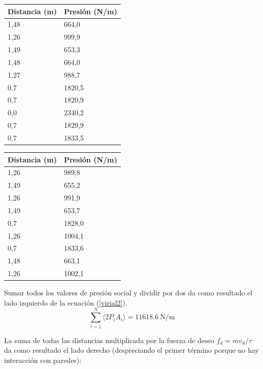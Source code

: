 \begin{center}
\label{my-label}
\begin{tabular}{|l|l|}
\hline
Distancia (m) & Presión (N/m) \\ \hline
1,48          & 664,0       \\ \hline
1,26          & 999,9       \\ \hline
1,49          & 653,3       \\ \hline
1,48          & 664,0       \\ \hline
1,27          & 988,7       \\ \hline
0,7           & 1820,5       \\ \hline
0,7           & 1820,9       \\ \hline
0,0           & 2340,2       \\ \hline
0,7           & 1829,9       \\ \hline
0,7           & 1833,5       \\ \hline
\end{tabular}
\quad
\begin{tabular}{|l|l|}
\hline
Distancia (m) & Presión (N/m) \\ \hline
1,26          & 989,8       \\ \hline
1,49          & 655,2       \\ \hline
1,26          & 991,9       \\ \hline
1,49          & 653,7        \\ \hline
0,7           & 1828,0       \\ \hline
1,26          & 1004,1       \\ \hline
0,7           & 1833,6       \\ \hline
1,48          & 663,1       \\ \hline
1,26          & 1002,1       \\ \hline
\end{tabular}
\end{center}


Sumar todos los valores de presión social y dividir por dos da como resultado el lado izquierdo de la ecuación (\ref{virial2}).
\begin{equation}
 \displaystyle\sum_{i=1}^N\langle2P_iA_i\rangle = 11618.6\ \text{N/m}
\end{equation}

La suma de todas las distancias multiplicada por la fuerza de deseo $f_d=mv_d/\tau$ da como resultado el lado derecho (despreciando el primer término porque no hay interacción con paredes):

